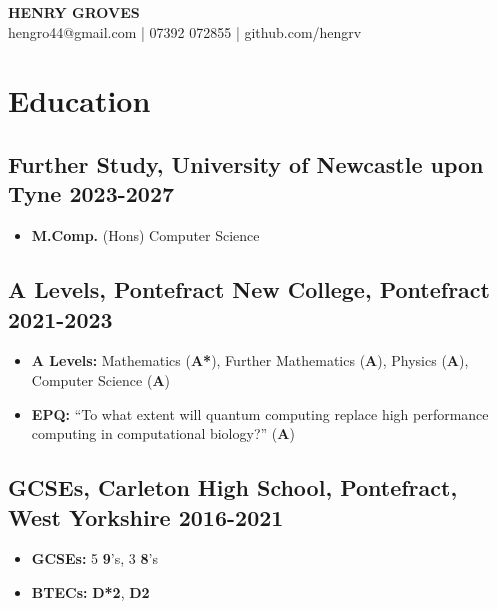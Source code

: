 \documentclass[9pt]{extarticle}
\makeatletter
\renewcommand{\maketitle}{
	\begin{center}
		{\huge\bfseries HENRY GROVES\\}
		\vspace{.5em}
		{\large hengro44@gmail.com | 07392 072855 | github.com/hengrv}
	\end{center}
}
\makeatother
\begin{document}
\thispagestyle{empty}
\maketitle

\begin{minipage}{0.97\textwidth}
	\section{Education}
	\subsection{Further Study, University of Newcastle upon Tyne \hfill 2023-2027}
	\vspace{-.2cm}
	\begin{itemize}
		\item \textbf{M.Comp.} (Hons) Computer Science
	\end{itemize}
	\vspace{-.6cm}
	\subsection{A Levels, Pontefract New College, Pontefract \hfill 2021-2023}
	\vspace{-0.2cm}
	\begin{itemize}
		\item {\bfseries A Levels:} Mathematics (\textbf{A*}), Further Mathematics (\textbf{A}), Physics (\textbf{A}), Computer Science (\textbf{A})
		      \vspace{-.1cm}
		\item {\bfseries EPQ: } ``To what extent will quantum computing replace high performance computing in computational biology?'' (\textbf{A})
	\end{itemize}
	\vspace{-.4cm}
	\normalsize
	\vspace{-.2cm}
	\subsection{GCSEs, Carleton High School, Pontefract, West Yorkshire \hfill 2016-2021}
	\vspace{-0.5cm}
	\begin{multicols}{3}
		\begin{itemize}
			\item \textbf{GCSEs:} 5 \textbf{9}'s, 3 \textbf{8}'s
			\item \textbf{BTECs:} \textbf{D*2}, \textbf{D2}
		\end{itemize}
	\end{multicols}

\end{minipage}
\vspace{.3cm}
\end{document}
